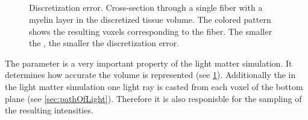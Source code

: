 \subsection{\Voxelsize}
%
\begin{figure}[!t]
\centering
\setlength{\tikzwidth}{.24\textwidth}

\caption{Discretization error. Cross-section through a single fiber with a myelin layer in the discretized tissue volume. The colored pattern shows the resulting voxels corresponding to the fiber. The smaller the \Voxelsize, the smaller the discretization error.}
\label{fig:vectorfield_disc_error}
\end{figure}
%
The parameter \Voxelsize{} is a very important property of the light matter simulation.
It determines how accurate the volume is represented (see \cref{fig:vectorfield_disc_error}).
Additionally the in the light matter simulation one light ray is casted from each voxel of the bottom plane (see \cref{sec:pathOfLight}). 
Therefore it is also responisble for the sampling of the resulting intensities.
%
%
% 
